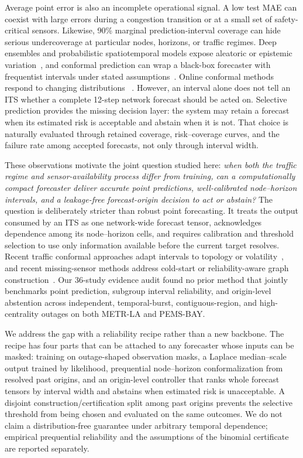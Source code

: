 \documentclass[preprint,12pt]{elsarticle}
\begin{document}
Average point error is also an incomplete operational signal. A low test MAE
can coexist with large errors during a congestion transition or at a small set
of safety-critical sensors. Likewise, 90\% marginal prediction-interval
coverage can hide serious undercoverage at particular nodes, horizons, or
traffic regimes. Deep ensembles and probabilistic spatiotemporal models expose
aleatoric or epistemic variation~\cite{wu2021uq,liu2024ensembleuq}, and
conformal prediction can wrap a black-box forecaster with frequentist
intervals under stated assumptions~\cite{stankeviciute2021conformal}. Online
conformal methods respond to changing distributions
~\cite{gibbs2024online,angelopoulos2024online}. However, an interval alone does
not tell an ITS whether a complete 12-step network forecast should be acted on.
Selective prediction provides the missing decision layer: the system may
retain a forecast when its estimated risk is acceptable and abstain when it is
not. That choice is naturally evaluated through retained coverage,
risk--coverage curves, and the failure rate among accepted forecasts, not only
through interval width.

These observations motivate the joint question studied here: \emph{when both
the traffic regime and sensor-availability process differ from training, can a
computationally compact forecaster deliver accurate point predictions,
well-calibrated node--horizon intervals, and a leakage-free forecast-origin
decision to act or abstain?} The question is deliberately stricter than robust
point forecasting. It treats the output consumed by an ITS as one network-wide
forecast tensor, acknowledges dependence among its node--horizon cells, and
requires calibration and threshold selection to use only information available
before the current target resolves. Recent traffic conformal approaches adapt
intervals to topology or volatility~\cite{patil2024conformal,wang2026csth}, and
recent missing-sensor methods address cold-start or reliability-aware graph
construction~\cite{wang2026scsamg,wu2026cast}. Our 36-study evidence audit found
no prior method that jointly benchmarks point prediction, subgroup interval
reliability, and origin-level abstention across independent, temporal-burst,
contiguous-region, and high-centrality outages on both METR-LA and PEMS-BAY.

We address the gap with a reliability recipe rather than a new backbone. The
recipe has four parts that can be attached to any forecaster whose inputs can
be masked: training on outage-shaped observation masks, a Laplace median--scale
output trained by likelihood, prequential node--horizon conformalization from
resolved past origins, and an origin-level controller that ranks whole forecast
tensors by interval width and abstains when estimated risk is unacceptable. A
disjoint construction/certification split among past origins prevents the
selective threshold from being chosen and evaluated on the same outcomes. We do
not claim a distribution-free guarantee under arbitrary temporal dependence;
empirical prequential reliability and the assumptions of the binomial
certificate are reported separately.
\end{document}
